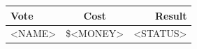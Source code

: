 \documentclass[9pt]{extarticle} %
\begin{document}
\begin{minipage}[t]{.35\linewidth}
\begin{mdframed}[style=sidebar,frametitle={}]

\begin{tabular}{lcr}

Vote & Cost & Result \\
\midrule
<NAME> & \$<MONEY> & <STATUS> \\
\bottomrule
\end{tabular}


\end{mdframed}
\end{minipage}\hfill %
%
%
\end{document}
